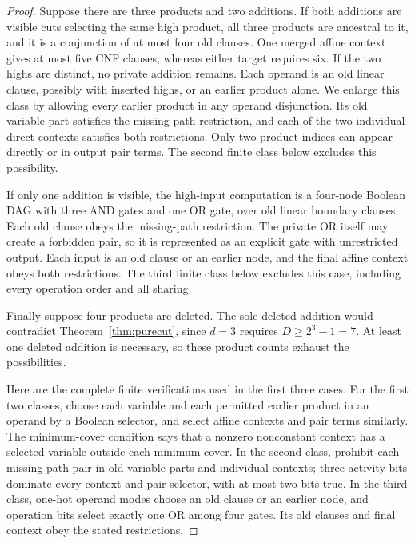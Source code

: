 \begin{proof}
Suppose there are three products and two additions. If both additions are visible cuts selecting the same high product, all three products are ancestral to it, and it is a conjunction of at most four old clauses. One merged affine context gives at most five CNF clauses, whereas either target requires six. If the two highs are distinct, no private addition remains. Each operand is an old linear clause, possibly with inserted highs, or an earlier product alone. We enlarge this class by allowing every earlier product in any operand disjunction. Its old variable part satisfies the missing-path restriction, and each of the two individual direct contexts satisfies both restrictions. Only two product indices can appear directly or in output pair terms. The second finite class below excludes this possibility.

If only one addition is visible, the high-input computation is a four-node Boolean DAG with three AND gates and one OR gate, over old linear boundary clauses. Each old clause obeys the missing-path restriction. The private OR itself may create a forbidden pair, so it is represented as an explicit gate with unrestricted output. Each input is an old clause or an earlier node, and the final affine context obeys both restrictions. The third finite class below excludes this case, including every operation order and all sharing.

Finally suppose four products are deleted. The sole deleted addition would contradict Theorem~\ref{thm:purecut}, since $d=3$ requires $D\ge2^3-1=7$. At least one deleted addition is necessary, so these product counts exhaust the possibilities.

Here are the complete finite verifications used in the first three cases. For the first two classes, choose each variable and each permitted earlier product in an operand by a Boolean selector, and select affine contexts and pair terms similarly. The minimum-cover condition says that a nonzero nonconstant context has a selected variable outside each minimum cover. In the second class, prohibit each missing-path pair in old variable parts and individual contexts; three activity bits dominate every context and pair selector, with at most two bits true. In the third class, one-hot operand modes choose an old clause or an earlier node, and operation bits select exactly one OR among four gates. Its old clauses and final context obey the stated restrictions.


\end{proof}
